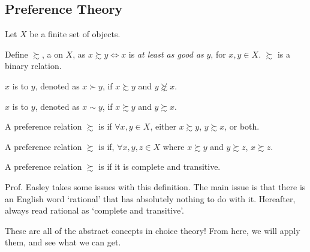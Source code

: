\documentclass[12pt]{article}
\begin{document}
\subsection{Preference Theory}

\begin{assumption}
	Let $X$ be a finite set of objects. 
\end{assumption}

\begin{definition}
	Define $\succsim$, a  on $X$, as $x \succsim y \Longleftrightarrow x$ is \emph{at least as good as} $y$, for $x,y \in X$. $\succsim$ is a binary relation.
\end{definition}

\begin{definition}
	$x$ is  to $y$, denoted as $x \succ y$, if $x \succsim y$ and $y \not\succsim x$.
\end{definition}
\begin{definition}
	$x$ is  to $y$, denoted as $x \sim y$, if $x \succsim y$ and $y \succsim x$.
\end{definition}

\begin{definition}
	A preference relation $\succsim$ is  if $\forall x,y \in X$, either $x\succsim y$, $y \succsim x$, or both.
\end{definition}
\begin{definition}
	A preference relation $\succsim$ is  if, $\forall x,y,z \in X$ where $x \succsim y$ and $y \succsim z$, $x \succsim z$.
\end{definition}
\begin{definition}
	A preference relation $\succsim$ is  if it is complete and transitive.
\end{definition}
\begin{remark}
	Prof. Easley takes some issues with this definition. The main issue is that there is an English word `rational' that has absolutely nothing to do with it. Hereafter, always read rational as `complete and transitive'.
\end{remark}

\begin{remark}
	These are all of the abstract concepts in choice theory! From here, we will apply them, and see what we can get. 
\end{remark}
\end{document}
